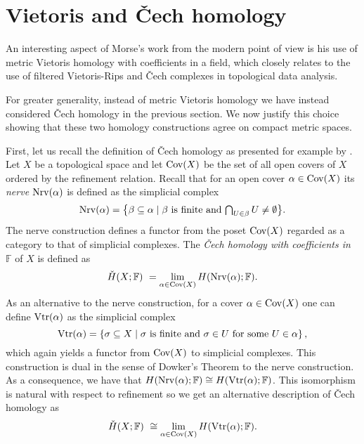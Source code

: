 
\section{Vietoris and \v{C}ech homology} \label{s:vietoris}

An interesting aspect of Morse's work from the modern point of view is his use of metric Vietoris homology with coefficients in a field, which closely relates to the use of filtered Vietoris-Rips and \v{C}ech complexes in topological data analysis.

For greater generality, instead of metric Vietoris homology we have instead considered \v{C}ech homology in the previous section.
We now justify this choice showing that these two homology constructions agree on compact metric spaces.

First, let us recall the definition of \v{C}ech homology as presented for example by \citet[Section IX--X]{Eilenberg.1952}.
Let $X$ be a topological space and let $\operatorname{Cov}(X)$ be the set of all open covers of $X$ ordered by the refinement relation. 
Recall that for an open cover $\alpha \in \operatorname{Cov}(X)$ its \emph{nerve} $\operatorname{Nrv}(\alpha)$ is defined as the simplicial complex
\begin{equation*}
\operatorname{Nrv}(\alpha) =
\big\{ \beta \subseteq \alpha \mid \beta \text{ is finite and } \textstyle{\bigcap_{U \in \beta}} \, U \neq \emptyset \big\}.
\end{equation*}
The nerve construction defines a functor from the poset $\operatorname{Cov}(X)$ regarded as a category to that of simplicial complexes. 
The \emph{\v{C}ech homology with coefficients in $\mathbb{F}$} of $X$ is defined as
\begin{equation*}
\check{H}(X; \mathbb{F}) \ =
\lim_{\alpha \in \operatorname{Cov}(X)} H(\operatorname{Nrv}(\alpha); \mathbb{F}).
\end{equation*}
As an alternative to the nerve construction, for a cover $\alpha \in \operatorname{Cov}(X)$ one can define $\operatorname{Vtr}(\alpha)$ as the simplicial complex
\begin{equation*}
\operatorname{Vtr} (\alpha) = \left\{ \sigma \subseteq X \mid \sigma \text{ is finite and } \sigma \in U \text{ for some } U \in \alpha \right\},
\end{equation*}
which again yields a functor from $\operatorname{Cov}(X)$ to simplicial complexes.
This construction is dual in the sense of Dowker's Theorem \cite{Dowker.1952} to the nerve construction.
As a consequence, we have that $H (\operatorname{Nrv} (\alpha); \mathbb{F}) \cong H (\operatorname{Vtr} (\alpha); \mathbb{F})$.
This isomorphism is natural with respect to refinement so we get an alternative description of \v{C}ech homology as 
\begin{equation*}
\check{H} (X; \mathbb{F}) \ \cong
\lim_{\alpha \in \operatorname{Cov} (X)} H (\operatorname{Vtr} (\alpha); \mathbb{F}).
\end{equation*}


